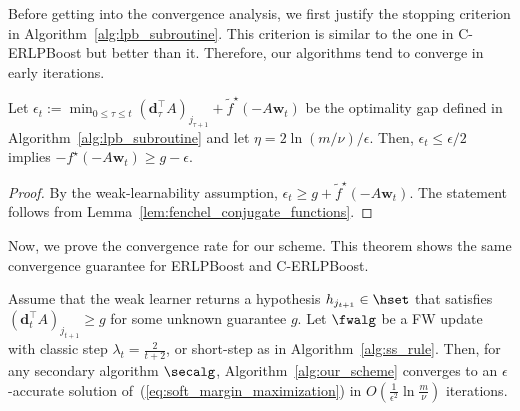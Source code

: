 Before getting into the convergence analysis, 
we first justify the stopping criterion 
in Algorithm~\ref{alg:lpb_subroutine}. 
This criterion is similar to the one in C-ERLPBoost 
but better than it. 
Therefore, our algorithms tend to converge in early iterations. 
\begin{lem.}
    \label{lem:stopping_criterion}
    Let 
    $
        \epsilon_t 
        := \min_{0 \leq \tau \leq t} (\bm{d}_{\tau}^\top A)_{j_{\tau + 1}}
        + \tilde{f}^\star( -A \bm{w}_t)
    $ be the optimality gap defined in Algorithm~\ref{alg:lpb_subroutine} 
    and let $\eta = 2 \ln(m / \nu) / \epsilon$. 
    Then, $\epsilon_t \leq \epsilon / 2$ implies 
    $- f^\star (- A \bm{w}_t ) \geq g - \epsilon$. 
\end{lem.}
\begin{proof}
    By the weak-learnability assumption, 
    $\epsilon_t \geq g + \tilde{f}^\star ( -A \bm{w}_t )$. 
    The statement follows from Lemma~\ref{lem:fenchel_conjugate_functions}.
\end{proof}
Now, we prove the convergence rate for our scheme. 
This theorem shows the same convergence guarantee for 
ERLPBoost and C-ERLPBoost. 
\begin{thm.}
    \label{thm:mlpboost_convergence_guarantee}
    Assume that the weak learner returns 
    a hypothesis $h_{j_{t+1}} \in \hset$ that satisfies
    $(\bm{d}_t^\top A)_{j_{t+1}} \geq g$ 
    for some unknown guarantee $g$. 
    Let $\fwalg$ be a FW update with 
    classic step $\lambda_t = \frac{2}{t+2}$, or
    short-step as in Algorithm~\ref{alg:ss_rule}. 
    Then, for any secondary algorithm $\secalg$, 
    Algorithm~\ref{alg:our_scheme} converges to 
    an $\epsilon$-accurate solution of~(\ref{eq:soft_margin_maximization}) 
    in $O\left( \frac{1}{\epsilon^2} \ln \frac{m}{\nu} \right)$ iterations. 
\end{thm.}
